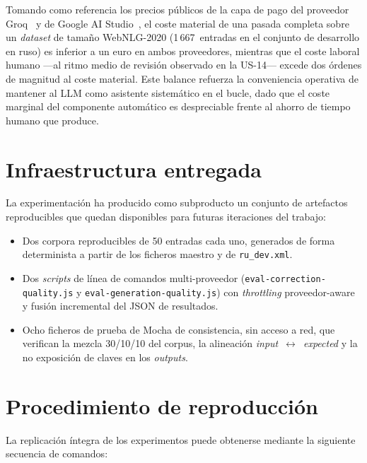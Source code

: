 Tomando como referencia los precios públicos de la capa de pago del proveedor
Groq~\cite{GroqPricing} y de Google AI Studio~\cite{GoogleAIPricing}, el coste
material de una pasada completa sobre un \textit{dataset} de tamaño WebNLG-2020
(1\,667~entradas en el conjunto de desarrollo en ruso) es inferior a un euro en
ambos proveedores, mientras que el coste laboral humano ---al ritmo medio de
revisión observado en la US-14--- excede dos órdenes de magnitud al coste
material. Este balance refuerza la conveniencia operativa de mantener al LLM
como asistente sistemático en el bucle, dado que el coste marginal del
componente automático es despreciable frente al ahorro de tiempo humano que
produce.

\section{Infraestructura entregada}

La experimentación ha producido como subproducto un conjunto de artefactos
reproducibles que quedan disponibles para futuras iteraciones del trabajo:

\begin{itemize}
	\item Dos corpora reproducibles de 50 entradas cada uno, generados de forma
	      determinista a partir de los ficheros maestro y de \texttt{ru\_dev.xml}.
	\item Dos \textit{scripts} de línea de comandos multi-proveedor
	      (\texttt{eval-correction-quality.js} y \texttt{eval-generation-quality.js}) con
	      \textit{throttling} proveedor-aware y fusión incremental del JSON de
	      resultados.
	\item Ocho ficheros de prueba de Mocha de consistencia, sin acceso a red, que
	      verifican la mezcla 30/10/10 del corpus, la alineación
	      \textit{input}~$\leftrightarrow$~\textit{expected} y la no exposición de claves
	      en los \textit{outputs}.
\end{itemize}

\section{Procedimiento de reproducción}

La replicación íntegra de los experimentos puede obtenerse mediante la
siguiente secuencia de comandos:

